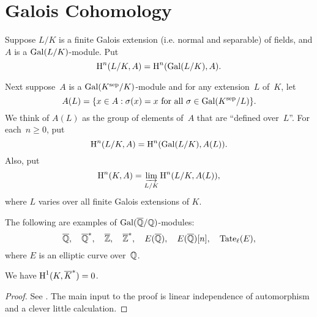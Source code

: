 \section{Galois Cohomology}

Suppose $L/K$ is a finite Galois extension
(i.e. normal and separable)
of fields, and $A$ is a $\operatorname{Gal}(L/K)$-module.
Put
$$
	\operatorname{H}^n(L/K, A) = \operatorname{H}^n(\operatorname{Gal}(L/K), A).
$$

Next suppose~$A$ is a $\operatorname{Gal}(K^{\operatorname{sep}}/K)$-module
and for any extension~$L$ of~$K$, let
$$
	A(L) = \{x \in A : \sigma(x) = x
	\text{ for all } \sigma \in\operatorname{Gal}(K^{\operatorname{sep}}/L)\}.
$$
We think of $A(L)$ as the group of elements of~$A$ that are
``defined over~$L$''.
For each~$n\geq 0$, put
$$
	\operatorname{H}^n(L/K, A) = \operatorname{H}^n(\operatorname{Gal}(L/K), A(L)).
$$
Also, put
$$
 \operatorname{H}^n(K,A) = \varinjlim_{L/K} \operatorname{H}^n(L/K,A(L)),
$$
where $L$ varies over all finite Galois extensions of $K$.

\begin{example}
The following are examples of $\operatorname{Gal}(\overline{\mathbb{Q}}/\mathbb{Q})$-modules:
$$
  \overline{\mathbb{Q}},\quad \overline{\mathbb{Q}}^*,\quad \overline{\mathbb{Z}},\quad\overline{\mathbb{Z}}^*,\quad E(\overline{\mathbb{Q}}),\quad
 E(\overline{\mathbb{Q}})[n], \quad {\rm Tate}_{\ell}(E),
$$
where $E$ is an elliptic curve over~$\mathbb{Q}$.
\end{example}

\begin{theorem}[Hilbert 90]\label{thm:h90}
We have $\operatorname{H}^1(K,\overline{K}^*) = 0$.
\end{theorem}
\begin{proof}
See \cite{serre:localfields}.  The main input to the proof is linear
independence of automorphism and a clever little calculation.
\end{proof}

